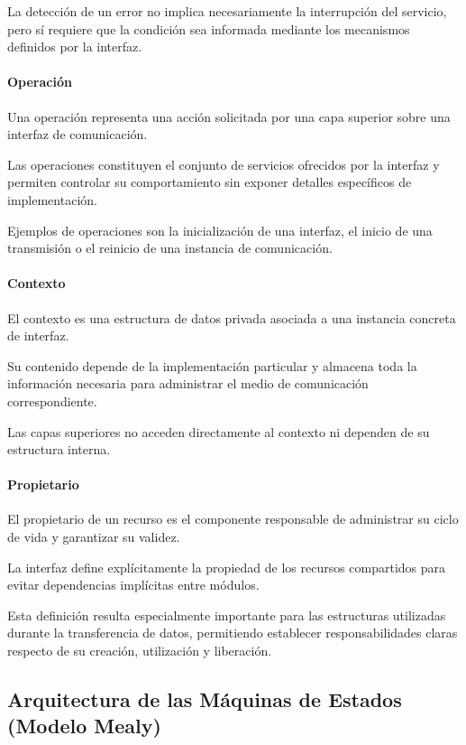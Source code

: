 La detección de un error no implica necesariamente la interrupción del servicio, pero sí requiere que la condición sea informada mediante los mecanismos definidos por la interfaz.

\paragraph{Operación}

Una operación representa una acción solicitada por una capa superior sobre una interfaz de comunicación.

Las operaciones constituyen el conjunto de servicios ofrecidos por la interfaz y permiten controlar su comportamiento sin exponer detalles específicos de implementación.

Ejemplos de operaciones son la inicialización de una interfaz, el inicio de una transmisión o el reinicio de una instancia de comunicación.

\paragraph{Contexto}

El contexto es una estructura de datos privada asociada a una instancia concreta de interfaz.

Su contenido depende de la implementación particular y almacena toda la información necesaria para administrar el medio de comunicación correspondiente.

Las capas superiores no acceden directamente al contexto ni dependen de su estructura interna.

\paragraph{Propietario}

El propietario de un recurso es el componente responsable de administrar su ciclo de vida y garantizar su validez.

La interfaz define explícitamente la propiedad de los recursos compartidos para evitar dependencias implícitas entre módulos.

Esta definición resulta especialmente importante para las estructuras utilizadas durante la transferencia de datos, permitiendo establecer responsabilidades claras respecto de su creación, utilización y liberación.

\subsection{Arquitectura de las Máquinas de Estados (Modelo Mealy)}
\label{subsec:arquitectura-fsm-mealy}

